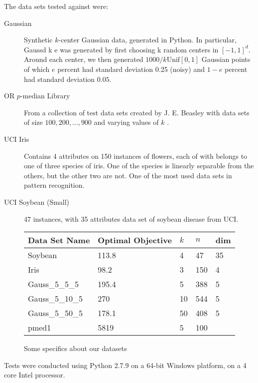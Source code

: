 \documentclass{article}
\begin{document}
The data sets tested against were:
\begin{description}
\item[Gaussian] Synthetic $k$-center Gaussian data, generated in Python. In particular, Gauss\textunderscore d \textunderscore k \textunderscore e was generated by first choosing k random centers in $[-1,1]^d$. Around each center, we then generated $1000/k \mathrm{Unif}[0,1]$ Gaussian points of which $e$ percent had standard deviation 0.25 (noisy) and $1-e$ percent had standard deviation $0.05$. 
\item[OR $p$-median Library] From a collection of test data sets created by J. E. Beasley with data sets of size $100, 200, \ldots, 900$ and varying values of $k$ \cite{Beasley}. 
\item[UCI Iris] \cite{Iris} Contains 4 attributes on 150 instances of flowers, each of with belongs to one of three species of iris.  One of the species is linearly separable from the others, but the other two are not.  One of the most used data sets in pattern recognition.
\item[UCI Soybean (Small)] \cite{Soybean} 47 instances, with 35 attributes data set of soybean disease from UCI.
\end{description} 

\begin{figure}[h]
\begin{tabular}{ | l | l | l | l | l | }
\hline
	Data Set Name &Optimal Objective & $k$ & $n$ & dim   \\ \hline
	Soybean & 113.8 & 4 & 47 & 35 \\ 
	Iris & 98.2 & 3 & 150 & 4 \\ 
	Gauss\_5\_5\_5 & 195.4 & 5 & 388 & 5 \\ 
	Gauss\_5\_10\_5 & 270 & 10 & 544 & 5 \\ 
	Gauss\_5\_50\_5 & 178.1 & 50 & 408 & 5 \\ 
	pmed1 & 5819 & 5 & 100 & \  \\ 
	\hline
\end{tabular}
\caption{Some specifics about our datasets}
\end{figure}

Tests were conducted using Python 2.7.9 on a 64-bit Windows platform, on a 4 core Intel processor. 
\end{document}
